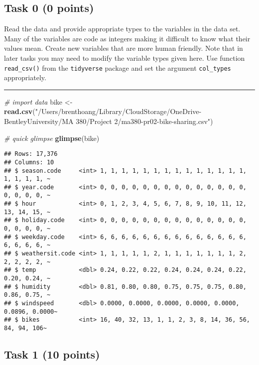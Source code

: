 \documentclass[
]{article}
\newenvironment{Shaded}{\begin{snugshade}}{\end{snugshade}}
\newcommand{\CommentTok}[1]{\textcolor[rgb]{0.56,0.35,0.01}{\textit{#1}}}
\newcommand{\FunctionTok}[1]{\textcolor[rgb]{0.13,0.29,0.53}{\textbf{#1}}}
\newcommand{\NormalTok}[1]{#1}
\newcommand{\OtherTok}[1]{\textcolor[rgb]{0.56,0.35,0.01}{#1}}
\newcommand{\StringTok}[1]{\textcolor[rgb]{0.31,0.60,0.02}{#1}}
\begin{document}
\hypertarget{task-0-0-points}{%
\subsection{Task 0 (0 points)}\label{task-0-0-points}}

Read the data and provide appropriate types to the variables in the data
set. Many of the variables are code as integers making it difficult to
know what their values mean. Create new variables that are more human
friendly. Note that in later tasks you may need to modify the variable
types given here. Use function \texttt{read\_csv()} from the
\texttt{tidyverse} package and set the argument \texttt{col\_types}
appropriately.

\begin{center}\rule{0.5\linewidth}{0.5pt}\end{center}

\begin{Shaded}
\begin{Highlighting}[]
\CommentTok{\# import data}
\NormalTok{bike }\OtherTok{\textless{}{-}} \FunctionTok{read.csv}\NormalTok{(}\StringTok{"/Users/brenthoang/Library/CloudStorage/OneDrive{-}BentleyUniversity/MA 380/Project 2/ma380{-}pr02{-}bike{-}sharing.csv"}\NormalTok{)}

\CommentTok{\# quick glimpse}
\FunctionTok{glimpse}\NormalTok{(bike)}
\end{Highlighting}
\end{Shaded}

\begin{verbatim}
## Rows: 17,376
## Columns: 10
## $ season.code     <int> 1, 1, 1, 1, 1, 1, 1, 1, 1, 1, 1, 1, 1, 1, 1, 1, 1, 1, ~
## $ year.code       <int> 0, 0, 0, 0, 0, 0, 0, 0, 0, 0, 0, 0, 0, 0, 0, 0, 0, 0, ~
## $ hour            <int> 0, 1, 2, 3, 4, 5, 6, 7, 8, 9, 10, 11, 12, 13, 14, 15, ~
## $ holiday.code    <int> 0, 0, 0, 0, 0, 0, 0, 0, 0, 0, 0, 0, 0, 0, 0, 0, 0, 0, ~
## $ weekday.code    <int> 6, 6, 6, 6, 6, 6, 6, 6, 6, 6, 6, 6, 6, 6, 6, 6, 6, 6, ~
## $ weathersit.code <int> 1, 1, 1, 1, 1, 2, 1, 1, 1, 1, 1, 1, 1, 2, 2, 2, 2, 2, ~
## $ temp            <dbl> 0.24, 0.22, 0.22, 0.24, 0.24, 0.24, 0.22, 0.20, 0.24, ~
## $ humidity        <dbl> 0.81, 0.80, 0.80, 0.75, 0.75, 0.75, 0.80, 0.86, 0.75, ~
## $ windspeed       <dbl> 0.0000, 0.0000, 0.0000, 0.0000, 0.0000, 0.0896, 0.0000~
## $ bikes           <int> 16, 40, 32, 13, 1, 1, 2, 3, 8, 14, 36, 56, 84, 94, 106~
\end{verbatim}

\hypertarget{task-1-10-points}{%
\subsection{Task 1 (10 points)}\label{task-1-10-points}}
\end{document}
